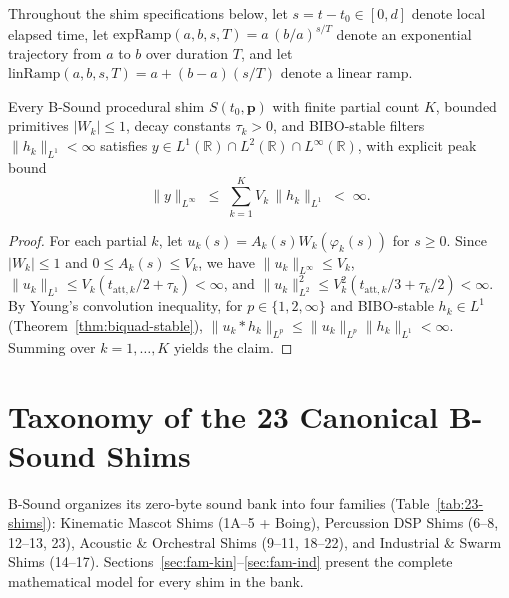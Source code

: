 Throughout the shim specifications below, let $s = t - t_0 \in [0, d]$ denote local elapsed time, let $\mathrm{expRamp}(a, b, s, T) = a\,(b/a)^{s/T}$ denote an exponential trajectory from $a$ to $b$ over duration $T$, and let $\mathrm{linRamp}(a, b, s, T) = a + (b - a)(s/T)$ denote a linear ramp.

\begin{theorem}
\label{thm:shim-l2}
Every B-Sound procedural shim $S(t_0, \mathbf{p})$ with finite partial count $K$, bounded primitives $|W_k| \le 1$, decay constants $\tau_k > 0$, and BIBO-stable filters $\|h_k\|_{L^1} < \infty$ satisfies $y \in L^1(\mathbb{R}) \cap L^2(\mathbb{R}) \cap L^\infty(\mathbb{R})$, with explicit peak bound
\begin{equation}
\|y\|_{L^\infty} \;\le\; \sum_{k=1}^{K} V_k \, \|h_k\|_{L^1} \;<\; \infty.
\end{equation}
\end{theorem}

\begin{proof}
For each partial $k$, let $u_k(s) = A_k(s) W_k(\varphi_k(s))$ for $s \ge 0$. Since $|W_k| \le 1$ and $0 \le A_k(s) \le V_k$, we have $\|u_k\|_{L^\infty} \le V_k$, $\|u_k\|_{L^1} \le V_k(t_{\mathrm{att},k}/2 + \tau_k) < \infty$, and $\|u_k\|_{L^2}^2 \le V_k^2(t_{\mathrm{att},k}/3 + \tau_k/2) < \infty$. By Young's convolution inequality, for $p \in \{1, 2, \infty\}$ and BIBO-stable $h_k \in L^1$ (Theorem~\ref{thm:biquad-stable}), $\|u_k * h_k\|_{L^p} \le \|u_k\|_{L^p}\|h_k\|_{L^1} < \infty$. Summing over $k = 1,\dots,K$ yields the claim.
\end{proof}

\section{Taxonomy of the 23 Canonical B-Sound Shims}

B-Sound organizes its zero-byte sound bank into four families (Table~\ref{tab:23-shims}): Kinematic Mascot Shims (1A--5 + Boing), Percussion DSP Shims (6--8, 12--13, 23), Acoustic \& Orchestral Shims (9--11, 18--22), and Industrial \& Swarm Shims (14--17). Sections~\ref{sec:fam-kin}--\ref{sec:fam-ind} present the complete mathematical model for every shim in the bank.

